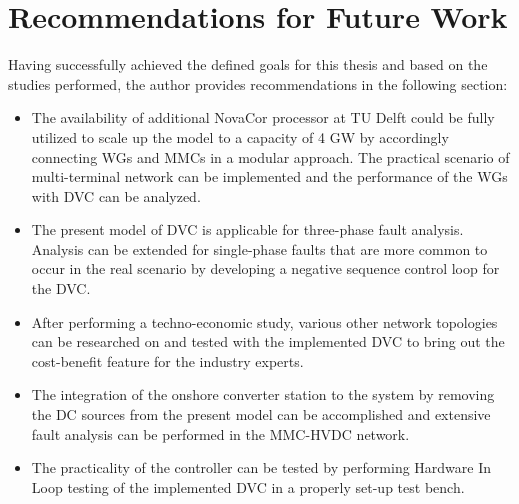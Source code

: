 \section{Recommendations for Future Work}
Having successfully achieved the defined goals for this thesis and based on the studies performed, the author provides recommendations in the following section:  
\begin{itemize}
    \item The availability of additional NovaCor processor at TU Delft could be fully utilized to scale up the model to a capacity of 4 GW by accordingly connecting \gls{WG}s and \gls{MMC}s in a modular approach. The practical scenario of multi-terminal network can be implemented and the performance of the \gls{WG}s with \gls{DVC} can be analyzed.
    \item The present model of \gls{DVC} is applicable for three-phase fault analysis. Analysis can be extended for single-phase faults that are more common to occur in the real scenario by developing a negative sequence control loop for the \gls{DVC}.
    \item After performing a techno-economic study, various other network topologies can be researched on and tested with the implemented \gls{DVC} to bring out the cost-benefit feature for the industry experts. 
    \item The integration of the onshore converter station to the system by removing the \gls{DC} sources from the present model can be accomplished and extensive fault analysis can be performed in the \gls{MMC}-\gls{HVDC} network.
    \item The practicality of the controller can be tested by performing Hardware In Loop testing of the implemented \gls{DVC} in a properly set-up test bench.
\end{itemize}